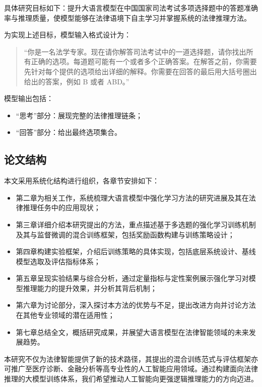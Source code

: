 \documentclass{pkuthesis}
\begin{document}
具体研究目标如下：提升大语言模型在中国国家司法考试多项选择题中的答题准确率与推理质量，使模型能够在法律语境下自主学习并掌握系统的法律推理方法。

为实现上述目标，模型输入格式设计为：
\begin{quote}
“你是一名法学专家。现在请你解答司法考试中的一道选择题，请你找出所有正确的选项。每道题可能有一个或者多个正确答案。在解答之前，你需要先针对每个提供的选项给出详细的解释。你需要在回答的最后用大括号圈出给出的答案，例如 {B} 或者 {ABD}。”
\end{quote}

模型输出包括：
\begin{itemize}
\item “思考”部分：展现完整的法律推理链条；
\item “回答”部分：给出最终选项集合。
\end{itemize}

\subsection{论文结构}

本文采用系统化结构进行组织，各章节安排如下：

\begin{itemize}
\item 第二章为相关工作，系统梳理大语言模型中强化学习方法的研究进展及其在法律推理任务中的应用现状；

\item 第三章详细介绍本研究提出的方法，重点描述基于多选题的强化学习训练机制及其与监督微调的混合训练框架，包括奖励函数构建与训练策略设计；

\item 第四章构建实验框架，介绍后训练策略的具体实现，包括底层系统设计、基线模型选取及评估指标体系；

\item 第五章呈现实验结果与综合分析，通过定量指标与定性案例展示强化学习对模型推理能力的提升效果，并分析其背后机制；

\item 第六章为讨论部分，深入探讨本方法的优势与不足，提出改进方向并讨论方法在其他专业领域的潜在适用性；

\item 第七章总结全文，概括研究成果，并展望大语言模型在法律智能领域的未来发展趋势。

\end{itemize}

本研究不仅为法律智能提供了新的技术路径，其提出的混合训练范式与评估框架亦可推广至医疗诊断、金融分析等高专业性的人工智能应用领域。通过构建面向法律推理的大模型训练体系，我们希望推动人工智能向更强逻辑推理能力的方向迈进。
\end{document}
